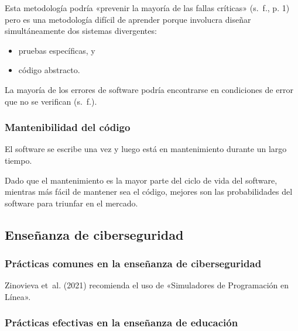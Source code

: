 \documentclass[
  12,
]{scrartcl}
\providecommand{\tightlist}{%
  \setlength{\itemsep}{0pt}\setlength{\parskip}{0pt}}
\begin{document}
Esta metodología podría «prevenir la mayoría de las fallas críticas»
(s.~f., p. 1) pero es una metodología difícil de aprender porque
involucra diseñar simultáneamente dos sistemas divergentes:

\begin{itemize}
\tightlist
\item
  pruebas específicas, y
\item
  código abstracto.
\end{itemize}

La mayoría de los errores de software podría encontrarse en condiciones
de error que no se verifican (s.~f.).

\hypertarget{mantenibilidad-del-cuxf3digo}{%
\subsubsection{Mantenibilidad del
código}\label{mantenibilidad-del-cuxf3digo}}

El software se escribe una vez y luego está en mantenimiento durante un
largo tiempo.

Dado que el mantenimiento es la mayor parte del ciclo de vida del
software, mientras más fácil de mantener sea el código, mejores son las
probabilidades del software para triunfar en el mercado.

\hypertarget{enseuxf1anza-de-ciberseguridad}{%
\subsection{Enseñanza de
ciberseguridad}\label{enseuxf1anza-de-ciberseguridad}}

\hypertarget{pruxe1cticas-comunes-en-la-enseuxf1anza-de-ciberseguridad}{%
\subsubsection{Prácticas comunes en la enseñanza de
ciberseguridad}\label{pruxe1cticas-comunes-en-la-enseuxf1anza-de-ciberseguridad}}

Zinovieva et~al. (2021) recomienda el uso de «Simuladores de
Programación en Línea».

\hypertarget{pruxe1cticas-efectivas-en-la-enseuxf1anza-de-educaciuxf3n}{%
\subsubsection{Prácticas efectivas en la enseñanza de
educación}\label{pruxe1cticas-efectivas-en-la-enseuxf1anza-de-educaciuxf3n}}
\end{document}
